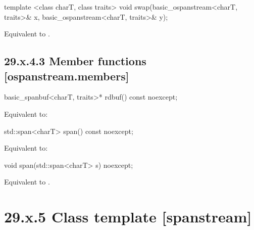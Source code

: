 \documentclass[ebook,11pt,article]{memoir}
\begin{document}
\begin{itemdecl}
template <class charT, class traits>
  void swap(basic_ospanstream<charT, traits>& x,
            basic_ospanstream<charT, traits>& y);
\end{itemdecl}

\begin{itemdescr}
\pnum
\effects Equivalent to .
\end{itemdescr}

\subsection{29.x.4.3 Member functions [ospanstream.members]}
\label{ospanstream.members}

\begin{itemdecl}
basic_spanbuf<charT, traits>* rdbuf() const noexcept;
\end{itemdecl}

\begin{itemdescr}
\pnum
\effects Equivalent to: \\
\end{itemdescr}

\begin{itemdecl}
std::span<charT> span() const noexcept;
\end{itemdecl}

\begin{itemdescr}
\pnum
\effects Equivalent to: \\
\end{itemdescr}

\begin{itemdecl}
void span(std::span<charT> s) noexcept;
\end{itemdecl}

\begin{itemdescr}
\pnum
\effects
Equivalent to
.
\end{itemdescr}

\section{29.x.5 Class template  [spanstream] }
\end{document}
